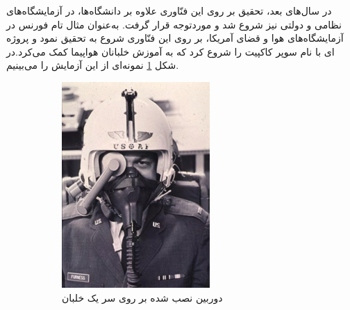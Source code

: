 در سال‌های بعد، تحقیق بر روی این فنّاوری علاوه بر دانشگاه‌ها، در آزمایشگاه‌های نظامی و دولتی نیز شروع شد و موردتوجه قرار گرفت. به‌عنوان‌ مثال تام فورنس در آزمایشگاه‌های هوا و قضای آمریکا، بر روی این فنّاوری شروع به تحقیق نمود و پروژه ای با نام سوپر کاکپیت را شروع کرد که به آموزش خلبانان هواپیما کمک می‌کرد\cite{Furness}.در شکل \ref{fig:airforce1} نمونه‌ای از این آزمایش را می‌بینیم.

\begin{figure}
	\centering
	\begin{subfigure}[b]{0.4\textwidth}
		\includegraphics[width=\textwidth]{image/airforce1}
		\caption{دوربین نصب شده بر روی سر یک خلبان}
		\label{fig:airforce1}
	\end{subfigure}
	~ %
	\begin{subfigure}[b]{0.5\textwidth}

\end{subfigure}
\end{figure}
